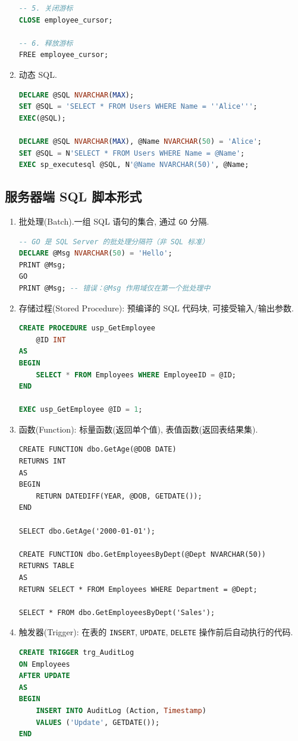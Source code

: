 \begin{enumerate}
\begin{lstlisting}[language=SQL]
-- 5. 关闭游标
CLOSE employee_cursor;

-- 6. 释放游标
FREE employee_cursor;
\end{lstlisting}
  \item 动态 SQL.
\begin{lstlisting}[language=SQL]
DECLARE @SQL NVARCHAR(MAX);
SET @SQL = 'SELECT * FROM Users WHERE Name = ''Alice''';
EXEC(@SQL);

DECLARE @SQL NVARCHAR(MAX), @Name NVARCHAR(50) = 'Alice';
SET @SQL = N'SELECT * FROM Users WHERE Name = @Name';
EXEC sp_executesql @SQL, N'@Name NVARCHAR(50)', @Name;
\end{lstlisting}
\end{enumerate}

\subsection{服务器端 SQL 脚本形式}

\begin{enumerate}
    \item 批处理(Batch).一组 SQL 语句的集合, 通过 \verb|GO| 分隔.
\begin{lstlisting}[language=SQL]
-- GO 是 SQL Server 的批处理分隔符（非 SQL 标准）
DECLARE @Msg NVARCHAR(50) = 'Hello';
PRINT @Msg;
GO
PRINT @Msg; -- 错误：@Msg 作用域仅在第一个批处理中
\end{lstlisting}
    \item 存储过程(Stored Procedure): 预编译的 SQL 代码块, 可接受输入/输出参数.
\begin{lstlisting}[language=SQL]
CREATE PROCEDURE usp_GetEmployee
    @ID INT
AS
BEGIN
    SELECT * FROM Employees WHERE EmployeeID = @ID;
END

EXEC usp_GetEmployee @ID = 1;
\end{lstlisting}
  \item 函数(Function): 标量函数(返回单个值), 表值函数(返回表结果集).
\begin{lstlisting}
CREATE FUNCTION dbo.GetAge(@DOB DATE)
RETURNS INT
AS
BEGIN
    RETURN DATEDIFF(YEAR, @DOB, GETDATE());
END

SELECT dbo.GetAge('2000-01-01');

CREATE FUNCTION dbo.GetEmployeesByDept(@Dept NVARCHAR(50))
RETURNS TABLE
AS
RETURN SELECT * FROM Employees WHERE Department = @Dept;

SELECT * FROM dbo.GetEmployeesByDept('Sales');
\end{lstlisting}
  \item 触发器(Trigger): 在表的 \verb|INSERT|, \verb|UPDATE|, \verb|DELETE| 操作前后自动执行的代码.
\begin{lstlisting}[language=SQL]
CREATE TRIGGER trg_AuditLog
ON Employees
AFTER UPDATE
AS
BEGIN
    INSERT INTO AuditLog (Action, Timestamp)
    VALUES ('Update', GETDATE());
END
\end{lstlisting}
\end{enumerate}
